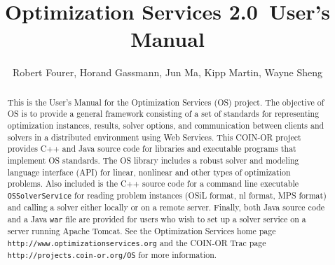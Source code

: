 \documentclass[11pt]{article}
\renewcommand{\_}{{\char"5F}}
\renewcommand{\{}{{\char"7B}}
\renewcommand{\}}{{\char"7D}}
\renewcommand{\^}{{\char"0D}}
\renewcommand{\'}{{\char"0D}}
\newcommand{\UrlOs}{http://www.optimizationservices.org}
\newcommand{\UrlTrac}{http://projects.coin-or.org/OS}
\newcommand{\OSstable}{2.0}
\begin{document}

\title{Optimization Services \OSstable\ User's Manual }
\vskip 2in
\author{Robert Fourer, Horand Gassmann, Jun Ma,  Kipp Martin, Wayne Sheng}
\maketitle

\begin{abstract}
This is the User's Manual for the Optimization Services (OS) project.  The objective of OS is to provide a
general framework consisting of a set of standards for representing optimization instances, results,
solver options, and communication between clients and solvers in a distributed environment using Web Services.
This COIN-OR project provides C++ and Java source code for libraries and executable programs that 
implement OS standards.   The OS library includes a robust solver and modeling language interface (API) for linear,
nonlinear and other types of optimization problems.   Also included is the C++ source code for a  command line
executable {\tt OSSolverService}  for reading problem instances 
(OSiL format, nl format, MPS format) and
calling a solver either locally or on a remote server.  Finally,  both Java source code and a Java {\tt war} 
file are provided for users who wish to set up a solver service on a server running Apache Tomcat.
See the Optimization Services home page {\tt\UrlOs} and the COIN-OR Trac page {\tt\UrlTrac} for 
more information.
\end{abstract}
\end{document}
